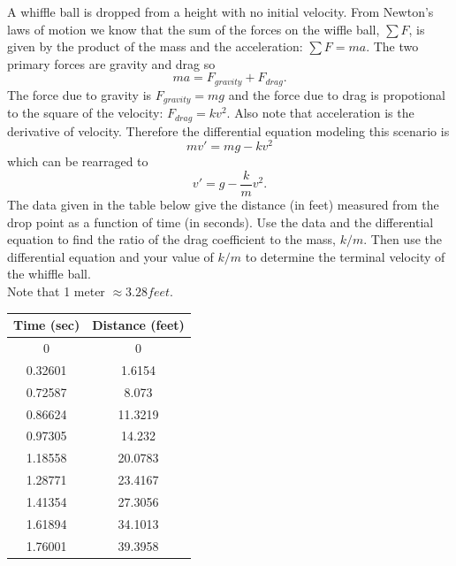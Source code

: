 \begin{problem}
    A whiffle ball is dropped from a height with no initial velocity.  From Newton's laws
    of motion we know that the sum of the forces on the wiffle ball, $\sum F$, is given by the product of
    the mass and the acceleration: $\sum F= ma$.  The two primary forces are gravity and
    drag so 
    \[ m a = F_{gravity} + F_{drag}. \]
    The force due to gravity is $F_{gravity} = mg$ and the force due to drag is
    propotional to the square of the velocity: $F_{drag} = k v^2$.  Also note that
    acceleration is the derivative of velocity.  Therefore the differential equation
    modeling this scenario is
    \[ m v' = mg - kv^2 \]
    which can be rearraged to 
    \[ v' = g - \frac{k}{m} v^2. \]
    The data given in the table below give the distance (in feet) measured from the drop
    point as a function of time (in seconds).  Use the data and the differential equation
    to find the ratio of the drag coefficient to the mass, $k/m$. Then use the
    differential equation and your value of $k/m$ to determine the terminal velocity of
    the whiffle ball. \\
    Note that 1 meter $\approx 3.28 feet$.
    \begin{center}
        \begin{tabular}{|c|c|}
            \hline
            Time (sec) & Distance (feet) \\ \hline \hline
0  & 0\\
0.32601&1.6154\\
0.72587&8.073\\
0.86624&11.3219\\
0.97305&14.232\\
1.18558&20.0783\\
1.28771&23.4167\\
1.41354&27.3056\\
1.61894&34.1013\\
1.76001&39.3958\\ \hline
        \end{tabular}
    \end{center}
\end{problem}

